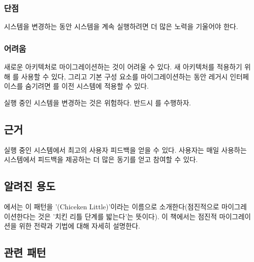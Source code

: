 \documentclass[a4paper,10pt,twoside]{book}
\begin{document}
\subsubsection*{단점}

\begin{bulletlist}
\item 시스템을 변경하는 동안 시스템을 계속 실행하려면 더 많은 노력을 기울어야 한다.
\end{bulletlist}

\subsubsection*{어려움}

\begin{bulletlist}
\item 새로운 아키텍처로 마이그레이션하는 것이 어려울 수 있다. 새 아키텍처를 적용하기 위해 를 사용할 수 있다, 그리고 기본 구성 요소를 마이그레이션하는 동안 레거시 인터페이스를 숨기려면 를 이전 시스템에 적용할 수 있다.

\item 실행 중인 시스템을 변경하는 것은 위험하다. 반드시 를 수행하자. 
\end{bulletlist}

\subsection*{근거}

실행 중인 시스템에서 최고의 사용자 피드백을 얻을 수 있다. 사용자는 매일 사용하는 시스템에서 피드백을 제공하는 더 많은 동기를 얻고 참여할 수 있다.

\subsection*{알려진 용도}

 \cite{Brod95a}에서는 이 패턴을 '(Chiceken Little)'이라는 이름으로 소개한다(점진적으로 마이그레이션한다는 것은 '치킨 리틀 단계를 밟는다'는 뜻이다). 이 책에서는 점진적 마이그레이션을 위한 전략과 기법에 대해 자세히 설명한다.

\subsection*{관련 패턴}
\end{document}
